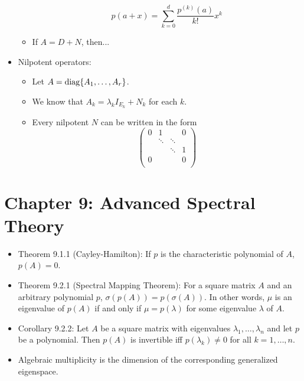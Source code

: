 \documentclass[../../notes.tex]{subfiles}
\begin{document}
\begin{itemize}
\begin{itemize}
        \begin{equation*}
            p(a+x) = \sum_{k=0}^d\frac{p^{(k)}(a)}{k!}x^k
        \end{equation*}
        \item If $A=D+N$, then...
    \end{itemize}
    \item Nilpotent operators:
    \begin{itemize}
        \item Let $A=\operatorname{diag}\{A_1,\dots,A_r\}$.
        \item We know that $A_k=\lambda_kI_{E_k}+N_k$ for each $k$.
        \item Every nilpotent $N$ can be written in the form
        \begin{equation*}
            \begin{pmatrix}
                0 & 1 &  & 0\\
                 & \ddots & \ddots & \\
                 &  & \ddots & 1\\
                0 &  &  & 0\\
            \end{pmatrix}
        \end{equation*}
    \end{itemize}
\end{itemize}



\section{Chapter 9: Advanced Spectral Theory}
\begin{itemize}
    \item {}Theorem 9.1.1 (Cayley-Hamilton): If $p$ is the characteristic polynomial of $A$, $p(A)=0$.
    \item Theorem 9.2.1 (Spectral Mapping Theorem): For a square matrix $A$ and an arbitrary polynomial $p$, $\sigma(p(A))=p(\sigma(A))$. In other words, $\mu$ is an eigenvalue of $p(A)$ if and only if $\mu=p(\lambda)$ for some eigenvalue $\lambda$ of $A$.
    \item Corollary 9.2.2: Let $A$ be a square matrix with eigenvalues $\lambda_1,\dots,\lambda_n$ and let $p$ be a polynomial. Then $p(A)$ is invertible iff $p(\lambda_k)\neq 0$ for all $k=1,\dots,n$.
    \item Algebraic multiplicity is the dimension of the corresponding generalized eigenspace.
\end{itemize}
\end{document}
